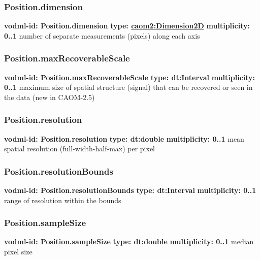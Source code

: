     \subsubsection{Position.dimension}
      \textbf{vodml-id: Position.dimension} \newline
      \textbf{type: \hyperref[sect:Dimension2D]{caom2:Dimension2D}} \newline
      \textbf{multiplicity: 0..1} \newline
      number of separate measurements (pixels) along each axis

    \subsubsection{Position.maxRecoverableScale}
      \textbf{vodml-id: Position.maxRecoverableScale} \newline
      \textbf{type: dt:Interval} \newline
      \textbf{multiplicity: 0..1} \newline
      maximum size of spatial structure (signal) that can be recovered or seen in the data (new in CAOM-2.5)

    \subsubsection{Position.resolution}
      \textbf{vodml-id: Position.resolution} \newline
      \textbf{type: dt:double} \newline
      \textbf{multiplicity: 0..1} \newline
      mean spatial resolution (full-width-half-max) per pixel

    \subsubsection{Position.resolutionBounds}
      \textbf{vodml-id: Position.resolutionBounds} \newline
      \textbf{type: dt:Interval} \newline
      \textbf{multiplicity: 0..1} \newline
      range of resolution within the bounds

    \subsubsection{Position.sampleSize}
      \textbf{vodml-id: Position.sampleSize} \newline
      \textbf{type: dt:double} \newline
      \textbf{multiplicity: 0..1} \newline
      median pixel size

